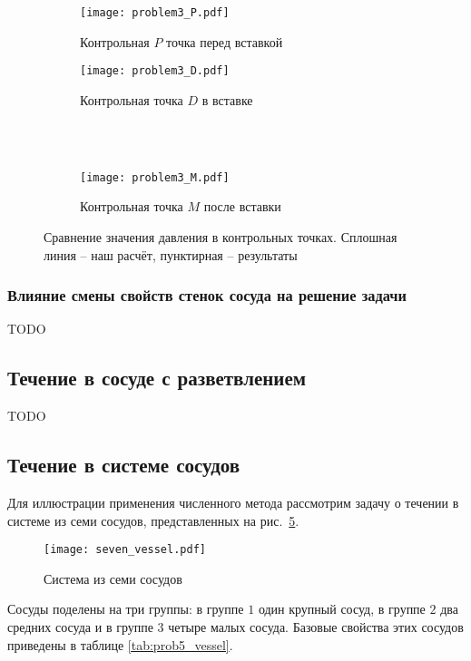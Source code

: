 \begin{figure}[h!]
\begin{subfigure}{0.5\linewidth}\centering
\texttt{[image: problem3\_P.pdf]}
\caption{Контрольная $P$ точка перед вставкой}\label{fig:prob3_a}
\end{subfigure}%
\begin{subfigure}{0.5\linewidth}\centering
\texttt{[image: problem3\_D.pdf]}
\caption{Контрольная точка $D$ в вставке}\label{fig:prob3_b}
\end{subfigure} \\
\hfill \\
\begin{subfigure}{0.5\linewidth}\centering
\texttt{[image: problem3\_M.pdf]}
\caption{Контрольная точка $M$ после вставки}\label{fig:prob3_c}
\end{subfigure}%
\caption{Сравнение значения давления в контрольных точках. Сплошная линия -- наш расчёт, пунктирная -- результаты~\cite{Sherwin2003}}\label{fig:prob3}
\end{figure}

\subsubsection{Влияние смены свойств стенок сосуда на решение задачи}
TODO

\subsection{Течение в сосуде с разветвлением}
TODO

\subsection{Течение в системе сосудов}
Для иллюстрации применения численного метода
рассмотрим задачу о течении в системе из семи сосудов, представленных на рис.~\ref{fig:seven_vessel}.
\begin{figure}[h!]
\centering
\texttt{[image: seven\_vessel.pdf]}
\caption{Система из семи сосудов}\label{fig:seven_vessel}
\end{figure}%

Сосуды поделены на три группы: в группе $1$ один крупный сосуд,
 в группе $2$ два средних сосуда и в группе $3$ четыре малых сосуда.
Базовые свойства этих сосудов приведены в таблице \cref{tab:prob5_vessel}.

